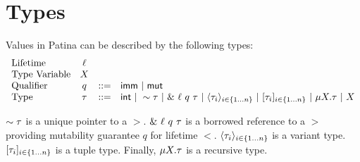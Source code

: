


\section*{Types}

Values in Patina can be described by the following types:
\[
\begin{array}{lccl}
\textrm{Lifetime} & \ell & & \\
\textrm{Type Variable} & X & & \\
\textrm{Qualifier} & q & ::= & \mathsf{imm} ~|~ \mathsf{mut} \\
\textrm{Type} & \tau & ::= & \mathsf{int} ~|~ \sim{\tau} ~|~ \&~{{\ell}~{q}~{\tau}} ~|~ 
				\langle{{\tau}_{i}}\rangle_{{i} \in \{1 \ldots {n}\} } ~|~ [{{\tau}_{i}}]_{{i} \in \{1 \ldots {n}\} } ~|~ 
				\mu {X}.{\tau} ~|~ X \\
\end{array}
\]

$\sim{\tau}$ is a unique pointer to a $\gt$.
$\&~{{\ell}~{q}~{\tau}}$ is a borrowed reference to a $\gt$
providing mutability guarantee $q$ for lifetime $\lt$.
$\langle{{\tau}_{i}}\rangle_{{i} \in \{1 \ldots {n}\} }$ is a variant type.
$[{{\tau}_{i}}]_{{i} \in \{1 \ldots {n}\} }$ is a tuple type.
Finally, $\mu {X}.{\tau}$ is a recursive type.
